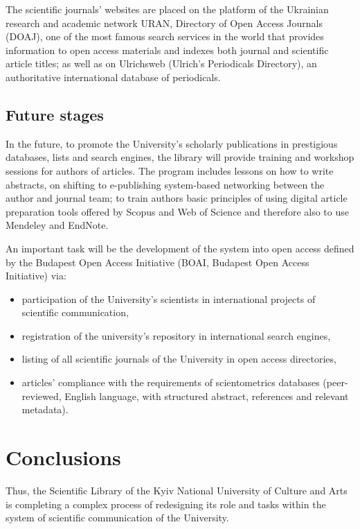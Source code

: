 \documentclass[a4paper,
fontsize=11pt,
oneside,
numbers=noperiodatend,
parskip=half-,
bibliography=totoc,
final
]{scrartcl}
\begin{document}
The scientific journals' websites are placed on the platform of the
Ukrainian research and academic network URAN, Directory of Open Access
Journals (DOAJ), one of the most famous search services in the world
that provides information to open access materials and indexes both
journal and scientific article titles; as well as on Ulrichsweb
(Ulrich's Periodicals Directory), an authoritative international
database of periodicals.

\hypertarget{future-stages}{%
\subsection{Future stages}\label{future-stages}}

In the future, to promote the University's scholarly publications in
prestigious databases, lists and search engines, the library will
provide training and workshop sessions for authors of articles. The
program includes lessons on how to write abstracts, on shifting to
e-publishing system-based networking between the author and journal
team; to train authors basic principles of using digital article
preparation tools offered by Scopus and Web of Science and therefore
also to use Mendeley and EndNote.

An important task will be the development of the system into open access
defined by the Budapest Open Access Initiative (BOAI, Budapest Open
Access Initiative) via:

\begin{itemize}
\item
  participation of the University's scientists in international projects
  of scientific communication,
\item
  registration of the university's repository in international search
  engines,
\item
  listing of all scientific journals of the University in open access
  directories,
\item
  articles' compliance with the requirements of scientometrics databases
  (peer-reviewed, English language, with structured abstract, references
  and relevant metadata).
\end{itemize}

\hypertarget{conclusions}{%
\section{Conclusions}\label{conclusions}}

Thus, the Scientific Library of the Kyiv National University of Culture
and Arts is completing a complex process of redesigning its role and
tasks within the system of scientific communication of the University.
\end{document}
